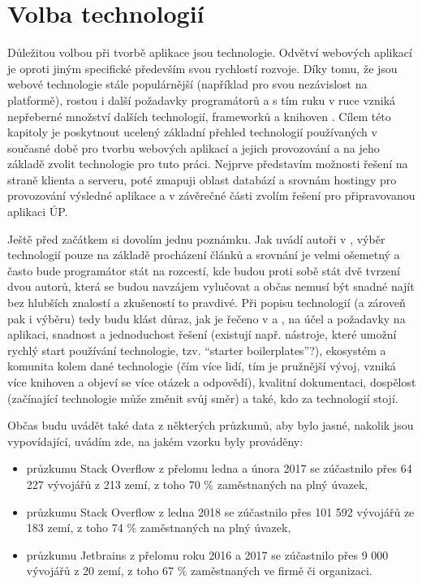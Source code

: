 \chapter{Volba technologií}\label{technologie}
Důležitou volbou při tvorbě aplikace jsou technologie. Odvětví webových aplikací je oproti jiným specifické především svou rychlostí rozvoje. Díky tomu, že jsou webové technologie stále populárnější (například pro svou nezávislost na platformě), rostou i další požadavky programátorů a s tím ruku v ruce vzniká nepřeberné množství dalších technologií, frameworků a knihoven \cite{moderni-webapps}\cite{moderni-webapps2}. Cílem této kapitoly je poskytnout ucelený základní přehled technologií používaných v současné době pro tvorbu webových aplikací a jejich provozování a na jeho základě zvolit technologie pro tuto práci. Nejprve představím možnosti řešení na straně klienta a serveru, poté zmapuji oblast databází a srovnám hostingy pro provozování výsledné aplikace a v závěrečné části zvolím řešení pro připravovanou aplikaci ÚP.

Ještě před začátkem si dovolím jednu poznámku. Jak uvádí autoři v \cite{technologie1}, výběr technologií pouze na základě procházení článků a srovnání je velmi ošemetný a často bude programátor stát na rozcestí, kde budou proti sobě stát dvě tvrzení dvou autorů, která se budou navzájem vylučovat a občas nemusí být snadné najít bez hlubších znalostí a zkušeností to pravdivé. Při popisu technologií (a zároveň pak i výběru) tedy budu klást důraz, jak je řečeno v \cite{technologie1} a \cite{technologie2}, na účel a požadavky na aplikaci, snadnost a jednoduchost řešení (existují např. nástroje, které umožní rychlý start používání technologie, tzv. \enquote{starter boilerplates}?), ekosystém a komunita kolem dané technologie (čím více lidí, tím je pružnější vývoj, vzniká více knihoven a objeví se více otázek a odpovědí), kvalitní dokumentaci, dospělost (začínající technologie může změnit svůj směr) a také, kdo za technologií stojí.

Občas budu uvádět také data z některých průzkumů, aby bylo jasné, nakolik jsou vypovídající, uvádím zde, na jakém vzorku byly prováděny:
\begin{itemize}
    \item průzkumu Stack Overflow \cite{stack-stats17} z přelomu ledna a února 2017 se zúčastnilo přes 64 227 vývojářů z 213 zemí, z toho 70 \% zaměstnaných na plný úvazek,
    \item průzkumu Stack Overflow \cite{stack-stats17} z ledna 2018 se zúčastnilo přes 101 592 vývojářů ze 183 zemí, z toho 74 \% zaměstnaných na plný úvazek,
    \item průzkumu Jetbrains \cite{jetbrains-stats} z přelomu roku 2016 a 2017 se zúčastnilo přes 9 000 vývojářů z 20 zemí, z toho 67 \% zaměstnaných ve firmě či organizaci.
\end{itemize}


